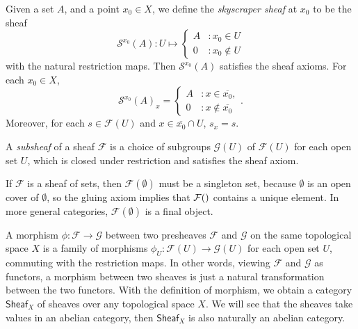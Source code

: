 \begin{example}
    Given a set $A$, and a point $x_0 \in X$, we define the \emph{skyscraper sheaf} at $x_0$ to be the sheaf
    \[ \mathcal{S}^{x_0}(A): U \mapsto \begin{cases} A &: x_0 \in U \\ 0 &: x_0 \not \in U \end{cases} \]
    with the natural restriction maps. Then $\mathcal{S}^{x_0}(A)$ satisfies the sheaf axioms. For each $x_0 \in X$,
    \[ \mathcal{S}^{x_0}(A)_x = \begin{cases} A &: x \in \overline{x_0}, \\ 0 &: x \not \in \overline{x_0} \end{cases}. \]
    Moreover, for each $s \in \mathcal{F}(U)$ and $x \in \overline{x_0} \cap U$, $s_x = s$.
\end{example}

A \emph{subsheaf} of a sheaf $\mathcal{F}$ is a choice of subgroups $\mathcal{G}(U)$ of $\mathcal{F}(U)$ for each open set $U$, which is closed under restriction and satisfies the sheaf axiom.

\begin{remark}
    If $\mathcal{F}$ is a sheaf of sets, then $\mathcal{F}(\emptyset)$ must be a singleton set, because $\emptyset$ is an open cover of $\emptyset$, so the gluing axiom implies that $\mathcal{F}(\empty)$ contains a unique element. In more general categories, $\mathcal{F}(\emptyset)$ is a final object.
\end{remark}

A morphism $\phi: \mathcal{F} \to \mathcal{G}$ between two presheaves $\mathcal{F}$ and $\mathcal{G}$ on the same topological space $X$ is a family of morphisms $\phi_U: \mathcal{F}(U) \to \mathcal{G}(U)$ for each open set $U$, commuting with the restriction maps. In other words, viewing $\mathcal{F}$ and $\mathcal{G}$ as functors, a morphism between two sheaves is just a natural transformation between the two functors. With the definition of morphism, we obtain a category $\mathsf{Sheaf}_X$ of sheaves over any topological space $X$. We will see that the sheaves take values in an abelian category, then $\mathsf{Sheaf}_X$ is also naturally an abelian category.

